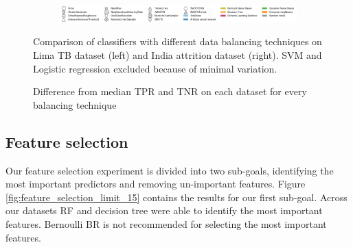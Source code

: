 \documentclass{sig-alternate-05-2015}
\begin{document}
\begin{figure}
\begin{subfigure}{.5\textwidth}
		\end{subfigure}
		\vspace*{-0.5cm}\hspace*{-3cm}\begin{subfigure}{\textwidth}
			\includegraphics[scale=0.6]{legend}
		\end{subfigure}	
		\caption{Comparison of classifiers with different data balancing techniques on Lima TB dataset (left) and India attrition dataset (right). SVM and Logistic regression excluded because of minimal variation.}
		\label{fig:classifier_vs_balancer}
	\end{figure}

	\begin{figure}
		\hspace*{1.2em}
		\centering
		\caption{Difference from median TPR and TNR on each dataset for every balancing technique}
		\label{fig:balancing_per_dataset}
	\end{figure}
	
	\subsection{Feature selection}
	Our feature selection experiment is divided into two sub-goals, identifying the most important predictors and removing un-important features. Figure \ref{fig:feature_selection_limit_15} contains the results for our first sub-goal. Across our datasets RF and decision tree were able to identify the most important features. Bernoulli BR is not recommended for selecting the most important features.
	
\end{document}
